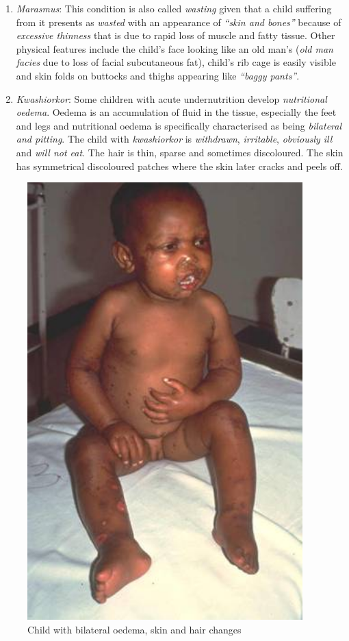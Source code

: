 \documentclass[12pt,]{book}
\theoremstyle{definition}
\theoremstyle{definition}
\theoremstyle{definition}
\theoremstyle{remark}
\begin{document}
\begin{enumerate}
\def\labelenumi{\arabic{enumi}.}
\item
  \emph{Marasmus}: This condition is also called \emph{wasting} given
  that a child suffering from it presents as \emph{wasted} with an
  appearance of \emph{``skin and bones''} because of \emph{excessive
  thinness} that is due to rapid loss of muscle and fatty tissue. Other
  physical features include the child's face looking like an old man's
  (\emph{old man facies} due to loss of facial subcutaneous fat),
  child's rib cage is easily visible and skin folds on buttocks and
  thighs appearing like \emph{``baggy pants''}.
\item
  \emph{Kwashiorkor}: Some children with acute undernutrition develop
  \emph{nutritional oedema}. Oedema is an accumulation of fluid in the
  tissue, especially the feet and legs and nutritional oedema is
  specifically characterised as being \emph{bilateral and pitting}. The
  child with \emph{kwashiorkor} is \emph{withdrawn}, \emph{irritable},
  \emph{obviously ill} and \emph{will not eat}. The hair is thin, sparse
  and sometimes discoloured. The skin has symmetrical discoloured
  patches where the skin later cracks and peels off.
\end{enumerate}

\begin{figure}

{\centering \includegraphics[width=4.19in]{images/oedema01} 

}

\caption{Child with bilateral oedema, skin and hair changes}\label{fig:unnamed-chunk-1}
\end{figure}
\end{document}
